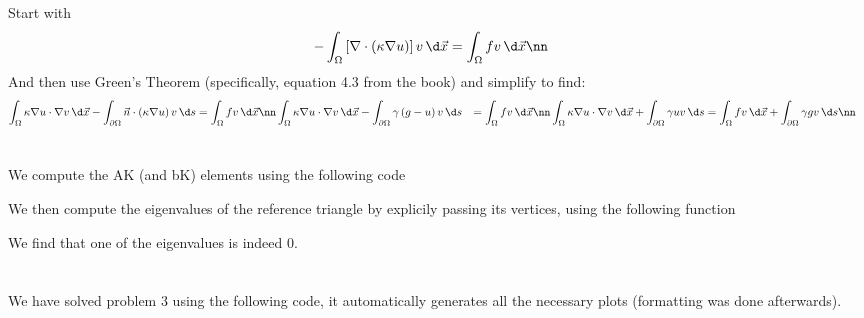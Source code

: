 
\usepackage[framed]{mcode}


\section{}
Start with
\begin{align}
  -\int_\Omega \left[\nabla\cdot\left(\kappa\nabla u\right)\right]v\,\d\vec x &= \int_\Omega fv\,\d\vec x\nn
\end{align}
And then use Green's Theorem (specifically, equation 4.3 from the book) and simplify to find:
\begin{align}
  \int_\Omega \kappa \nabla u \cdot \nabla v\,\d\vec x - \int_{\partial\Omega}\vec n\cdot\left(\kappa\nabla u\right)v\,\d s &= \int_\Omega fv \,\d\vec x\nn
  \int_\Omega \kappa \nabla u \cdot \nabla v \,\d\vec x - \int_{\partial\Omega}\gamma\left(g-u\right)v\,\d s &= \int_\Omega fv \,\d\vec x\nn
  \int_\Omega \kappa \nabla u \cdot \nabla v\,\d\vec x + \int_{\partial\Omega}\gamma uv\,\d s &= \int_\Omega fv\,\d\vec x + \int_{\partial\Omega}\gamma gv\,\d s \nn
\end{align}

\section{}
We compute the AK (and bK) elements using the following code


We then compute the eigenvalues of the reference triangle by explicily passing its vertices, using the following function


We find that one of the eigenvalues is indeed 0.
\section{}
We have solved problem 3 using the following code, it automatically generates all the necessary plots (formatting was done afterwards).

